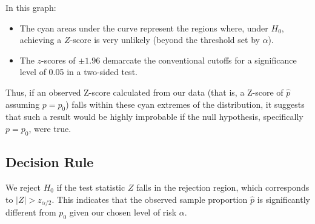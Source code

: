 \documentclass[11pt]{article}
\begin{document}
\begin{center}
\end{center}

In this graph:
\begin{itemize}
    \item The cyan areas under the curve represent the regions where, under \( H_0 \), achieving a \( Z \)-score is very unlikely (beyond the threshold set by \( \alpha \)).
    \item The \( z \)-scores of \( \pm 1.96 \) demarcate the conventional cutoffs for a significance level of 0.05 in a two-sided test.
\end{itemize}

Thus, if an observed Z-score calculated from our data (that is, a Z-score of \( \hat{p} \) assuming \( p = p_0 \)) falls within these cyan extremes of the distribution, it suggests that such a result would be highly improbable if the null hypothesis, specifically \( p = p_0 \), were true.


\subsection*{Decision Rule}
We reject \( H_0 \) if the test statistic \( Z \) falls in the rejection region, which corresponds to \( |Z| > z_{\alpha/2} \). This indicates that the observed sample proportion \( \hat{p} \) is significantly different from \( p_0 \) given our chosen level of risk \( \alpha \).
\end{document}
